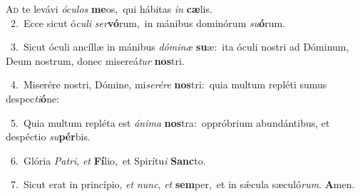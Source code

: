 \lettrine{\initial\textcolor{\initialcolor}{A}}{d} te levávi \textit{ó}\-\textit{cu}\textit{los} \textbf{me}\-os,~\star qui hábitas \textit{in} \textbf{cæ}\-lis.\\
{\numbfont\textcolor{\numbcolor}{~2.}}~Ecce sicut ó\-\textit{cu}\-\textit{li} \textit{ser}\-\textbf{vó}rum,~\star in mánibus dominórum \textit{su}\-\textbf{ó}rum.\par
{\numbfont\textcolor{\numbcolor}{~3.}}~Sicut óculi ancíllæ in mánibus \textit{dó}\-\textit{mi}\textit{næ} \textbf{su}\-æ:~\star ita óculi nostri ad Dóminum, Deum nostrum, donec misereá\textit{tur} \textbf{nos}\-tri.\par
{\numbfont\textcolor{\numbcolor}{~4.}}~Miserére nostri, Dómine, mi\-\textit{se}\-\textit{ré}\textit{re} \textbf{nos}\-tri:~\star quia multum repléti sumus despec\-\textit{ti}\-\textbf{ó}ne:\par
{\numbfont\textcolor{\numbcolor}{~5.}}~Quia multum repléta est \textit{á}\-\textit{ni}\textit{ma} \textbf{nos}\-tra:~\star oppróbrium abundántibus, et despéctio \textit{su}\-\textbf{pér}bis.\par
{\numbfont\textcolor{\numbcolor}{~6.}}~Glória \textit{Pa}\-\textit{tri}, \textit{et} \textbf{Fí}\-lio,~\star et Spirítu\textit{i} \textbf{Sanc}\-to.\par
{\numbfont\textcolor{\numbcolor}{~7.}}~Sicut erat in princípio, \textit{et} \textit{nunc}\-, \textit{et} \textbf{sem}\-per,~\star et in sǽcula sæculó\-\textit{rum}\-. \textbf{A}\-men.\par
